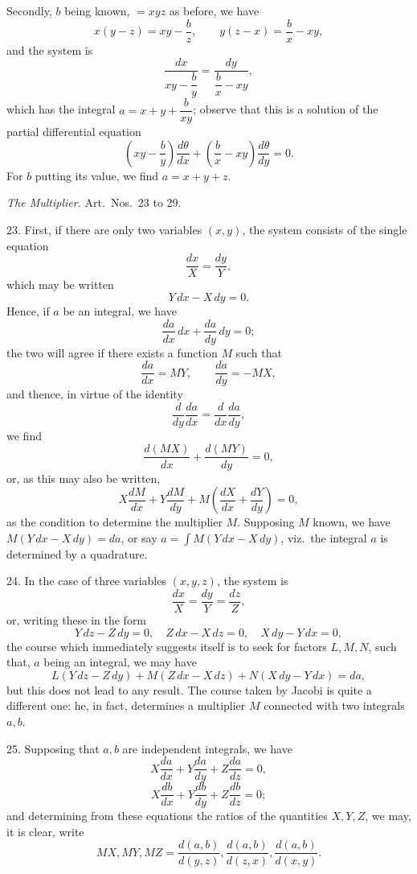 \documentclass[11pt,a4paper]{article}
\begin{document}

Secondly, $b$ being known, $= xyz$ as before, we have
\[
x(y - z) = x y - \frac{b}{z}, \qquad y(z - x) = \frac{b}{x} - xy,
\]
and the system is
\[
\frac{dx}{xy - \dfrac{b}{y}} = \frac{dy}{\dfrac{b}{x} - xy},
\]
which has the integral $a = x + y + \dfrac{b}{xy}$; observe that this is a solution of the partial differential equation
\[
\left(xy - \frac{b}{y}\right)\frac{d\theta}{dx} + \left(\frac{b}{x} - xy\right)\frac{d\theta}{dy} = 0.
\]
For $b$ putting its value, we find $a = x + y + z$.

\bigskip

\begin{center}
\emph{The Multiplier.} Art.\ Nos.\ 23 to 29.
\end{center}

\medskip

23. First, if there are only two variables $(x, y)$, the system consists of the single equation
\[
\frac{dx}{X} = \frac{dy}{Y},
\]
which may be written
\[
Y\,dx - X\,dy = 0.
\]
Hence, if $a$ be an integral, we have
\[
\frac{da}{dx}\,dx + \frac{da}{dy}\,dy = 0;
\]
the two will agree if there exists a function $M$ such that
\[
\frac{da}{dx} = MY, \qquad \frac{da}{dy} = -MX,
\]
and thence, in virtue of the identity
\[
\frac{d}{dy}\frac{da}{dx} = \frac{d}{dx}\frac{da}{dy},
\]
we find
\[
\frac{d(MX)}{dx} + \frac{d(MY)}{dy} = 0,
\]
or, as this may also be written,
\[
X\frac{dM}{dx} + Y\frac{dM}{dy} + M\!\left(\frac{dX}{dx} + \frac{dY}{dy}\right) = 0,
\]
as the condition to determine the multiplier $M$. Supposing $M$ known, we have $M(Y\,dx - X\,dy) = da$, or say $a = \displaystyle\int M(Y\,dx - X\,dy)$, viz.\ the integral $a$ is determined by a quadrature.

\newpage


24. In the case of three variables $(x, y, z)$, the system is
\[
\frac{dx}{X} = \frac{dy}{Y} = \frac{dz}{Z},
\]
or, writing these in the form
\[
Y\,dz - Z\,dy = 0, \quad Z\,dx - X\,dz = 0, \quad X\,dy - Y\,dx = 0,
\]
the course which immediately suggests itself is to seek for factors $L, M, N$, such that, $a$ being an integral, we may have
\[
L(Y\,dz - Z\,dy) + M(Z\,dx - X\,dz) + N(X\,dy - Y\,dx) = da,
\]
but this does not lead to any result. The course taken by Jacobi is quite a different one: he, in fact, determines a multiplier $M$ connected with two integrals $a, b$.

25. Supposing that $a, b$ are independent integrals, we have
\[
X\frac{da}{dx} + Y\frac{da}{dy} + Z\frac{da}{dz} = 0,
\]
\[
X\frac{db}{dx} + Y\frac{db}{dy} + Z\frac{db}{dz} = 0;
\]
and determining from these equations the ratios of the quantities $X, Y, Z$, we may, it is clear, write
\[
MX, MY, MZ = \frac{d(a, b)}{d(y, z)}, \frac{d(a, b)}{d(z, x)}, \frac{d(a, b)}{d(x, y)}.
\]
\end{document}
